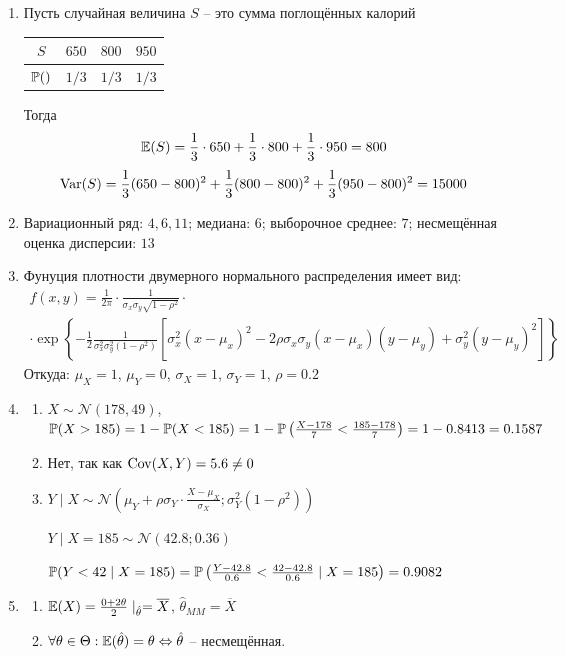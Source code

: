 \documentclass[12pt, a4paper]{article}\usepackage[]{graphicx}\usepackage[]{color}
\begin{document}
\begin{enumerate}
	\item Пусть случайная величина $S$ – это сумма поглощённых калорий

	\begin{tabular}{c|ccc}
		$S$ & $650$ & $800$ & $950$ \\
		\hline
		$\P()$ & $1/3$ & $1/3$ & $1/3$ \\
	\end{tabular}

	Тогда
	\[
	\E(S) = \frac{1}{3}\cdot 650 +  \frac{1}{3}\cdot 800 +  \frac{1}{3}\cdot 950 = 800
	\]
	\[
	 \Var(S) = \frac{1}{3}(650-800)^2 + \frac{1}{3}(800-800)^2 + \frac{1}{3}(950-800)^2 = 15000
	 \]
	\item Вариационный ряд: $4, 6, 11$; медиана: $6$; выборочное среднее: $7$; несмещённая оценка дисперсии: $13$
	\item Фунуция плотности двумерного нормального распределения имеет вид:
	\begin{multline*}
	f(x,y) =  \frac{1}{2\pi}\cdot \frac{1}{\sigma_x \sigma_y \sqrt{1-\rho^2}} \cdot \\
	\cdot \exp\left\{{-\frac{1}{2}\frac{1}{\sigma_x^2 \sigma_y^2(1-\rho^2)}\left[\sigma_x^2(x-\mu_x)^2-2\rho\sigma_x\sigma_y(x-\mu_x)(y-\mu_y)+\sigma_y^2(y-\mu_y)^2\right]}\right\}
	\end{multline*}
	Откуда: $\mu_X=1$, $\mu_Y=0$, $\sigma_X = 1$, $\sigma_Y = 1$, $\rho = 0.2$

	\item
	\begin{enumerate}
		\item $X \sim \mathcal{N}(178, 49)$, $\P(X>185) = 1  - \P(X<185) = 1- \P\left(\frac{X-178}{7} < \frac{185-178}{7}\right) = 1 - 0.8413 = 0.1587$
		\item Нет, так как $\Cov(X, Y) = 5.6 \neq 0$
		\item $Y \mid X \sim \mathcal{N}\left(\mu_Y + \rho\sigma_Y\cdot\frac{X-\mu_X}{\sigma_X}; \sigma_Y^2(1-\rho^2)\right)$

		$Y \mid X=185 \sim \mathcal{N}(42.8;0.36)$

		$\P(Y<42 \mid X=185) = \P\left(\frac{Y-42.8}{0.6} < \frac{42-42.8}{0.6}\mid X=185\right) = 0.9082$
	\end{enumerate}

	\item
	\begin{enumerate}
		\item $\E(X) = \frac{0+2\theta}{2}\mid_{\hat{\theta}} = \overline{X}$, $\hat{\theta}_{MM} = \overline{X}$
		\item $\forall \theta \in \Theta: \E(\hat{\theta})=\theta \Leftrightarrow \hat{\theta}$ – несмещённая.


\end{enumerate}
\end{enumerate}
\end{document}
